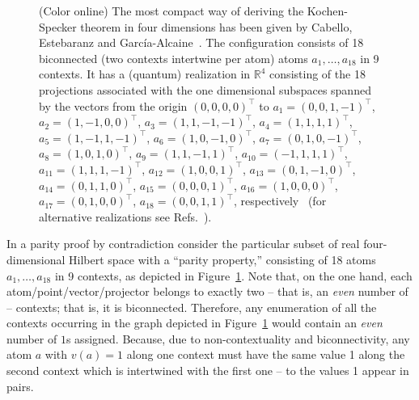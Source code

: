 \documentclass[%
  twocolumn,
 showpacs,
 showkeys,
 preprintnumbers,
 amsmath,amssymb,
 aps,
  pra,
  longbibliography,
 floatfix,
 ]{revtex4-1}
\begin{document}
\begin{figure}
\begin{center}
\begin{tikzpicture}  [scale=0.6]
	\end{tikzpicture}
\end{center}
\caption{(Color online)
The most compact way of deriving the Kochen-Specker theorem in four dimensions has been given by
Cabello, Estebaranz and Garc{\'{i}}a-Alcaine~\cite{cabello-96}.
The configuration consists of 18 biconnected (two contexts intertwine per atom)
atoms $a_1, \ldots , a_{18}$ in 9 contexts.
It has a (quantum) realization in $\mathbb{R}^4$
consisting of the 18 projections associated with the one dimensional subspaces spanned by
the vectors from the origin $(0,0,0,0)^\intercal$ to
$a_1=\left(   0,0,1,-1     \right)^\intercal    $,
$a_2=\left(   1,-1,0,0     \right)^\intercal    $,
$a_3=\left(   1,1,-1,-1    \right)^\intercal   $,
$a_4=\left(   1,1,1,1      \right)^\intercal     $,
$a_5=\left(   1,-1,1,-1    \right)^\intercal  $,
$a_6=\left(   1,0,-1,0     \right)^\intercal   $,
$a_7=\left(   0,1,0,-1   \right)^\intercal   $,
$a_8=\left(   1,0,1,0    \right)^\intercal    $,
$a_9=\left(   1,1,-1,1   \right)^\intercal   $,
$a_{10}=\left(-1,1,1,1   \right)^\intercal    $,
$a_{11}=\left(1,1,1,-1   \right)^\intercal    $,
$a_{12}=\left(1,0,0,1    \right)^\intercal     $,
$a_{13}=\left(0,1,-1,0   \right)^\intercal    $,
$a_{14}=\left(0,1,1,0    \right)^\intercal    $,
$a_{15}=\left(0,0,0,1    \right)^\intercal    $,
$a_{16}=\left(1,0,0,0    \right)^\intercal    $,
$a_{17}=\left(0,1,0,0    \right)^\intercal    $,
$a_{18}=\left(0,0,1,1    \right)^\intercal    $,
 respectively~\cite[Fig.~1]{cabello:210401}
(for alternative realizations see Refs.~\cite{cabello-99,cabello:210401}).
%
\label{2016-pu-book-chapter-qm-f-kspac}
}
\end{figure}

In a parity proof by contradiction
consider the particular subset of real four-dimensional Hilbert space with a ``parity property,''
consisting of 18 atoms $a_1, \ldots , a_{18}$ in 9 contexts,
as depicted in Figure~\ref{2016-pu-book-chapter-qm-f-kspac}.
Note that, on the one hand,
each atom/point/vector/projector belongs
to exactly two -- that is, an {\em even} number of -- contexts; that is, it is biconnected.
Therefore,
any enumeration of  all the contexts occurring in the graph
depicted in Figure~\ref{2016-pu-book-chapter-qm-f-kspac}
would contain an {\em even} number of $1$s assigned.
Because, due to non-contextuality and biconnectivity,
any atom $a$ with $v(a)=1$ along one context must have the same value 1 along the second context
which is intertwined with the first one -- to the values 1 appear in pairs.
\end{document}
